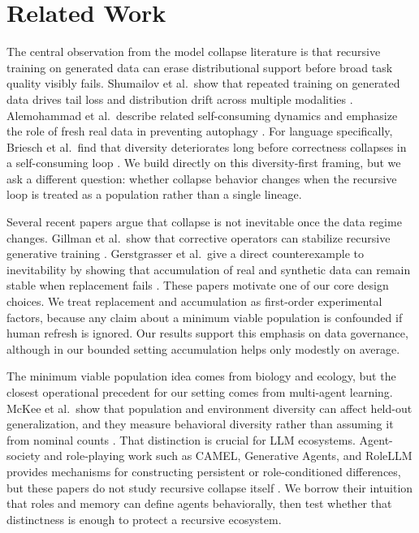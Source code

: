 \section{Related Work}
\label{sec:related_work}

The central observation from the model collapse literature is that recursive training on generated data can erase distributional support before broad task quality visibly fails. Shumailov et al.\ show that repeated training on generated data drives tail loss and distribution drift across multiple modalities \cite{shumailov2023curse}. Alemohammad et al.\ describe related self-consuming dynamics and emphasize the role of fresh real data in preventing autophagy \cite{alemohammad2023self}. For language specifically, Briesch et al.\ find that diversity deteriorates long before correctness collapses in a self-consuming loop \cite{briesch2023large}. We build directly on this diversity-first framing, but we ask a different question: whether collapse behavior changes when the recursive loop is treated as a population rather than a single lineage.

Several recent papers argue that collapse is not inevitable once the data regime changes. Gillman et al.\ show that corrective operators can stabilize recursive generative training \cite{gillman2024selfcorrecting}. Gerstgrasser et al.\ give a direct counterexample to inevitability by showing that accumulation of real and synthetic data can remain stable when replacement fails \cite{gerstgrasser2024model}. These papers motivate one of our core design choices. We treat replacement and accumulation as first-order experimental factors, because any claim about a minimum viable population is confounded if human refresh is ignored. Our results support this emphasis on data governance, although in our bounded setting accumulation helps only modestly on average.

The minimum viable population idea comes from biology and ecology, but the closest operational precedent for our setting comes from multi-agent learning. McKee et al.\ show that population and environment diversity can affect held-out generalization, and they measure behavioral diversity rather than assuming it from nominal counts \cite{mckee2021quantifying}. That distinction is crucial for LLM ecosystems. Agent-society and role-playing work such as CAMEL, Generative Agents, and RoleLLM provides mechanisms for constructing persistent or role-conditioned differences, but these papers do not study recursive collapse itself \cite{li2023camel,park2023generative,wang2023rolellm}. We borrow their intuition that roles and memory can define agents behaviorally, then test whether that distinctness is enough to protect a recursive ecosystem.

